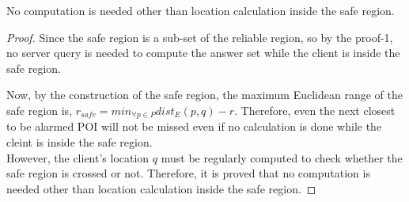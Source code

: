 \begin{theorem}
No computation is needed other than location calculation inside the safe region.
\end{theorem}

\begin{proof}
Since the safe region is a sub-set of the reliable region, so by the proof-1, no server query is needed to compute the answer set while the client is inside the safe region.

Now, by the construction of the safe region, the maximum Euclidean range of the safe region is, $r_{safe} = min_{\forall p \in P} dist_E(p, q) - r$. Therefore, even the next closest to be alarmed POI will not be missed even if no calculation is done while the cleint is inside the safe region.\\
However, the client's location $q$ must be regularly computed to check whether the safe region is crossed or not. Therefore, it is proved that no computation is needed other than location calculation inside the safe region.
\end{proof} 